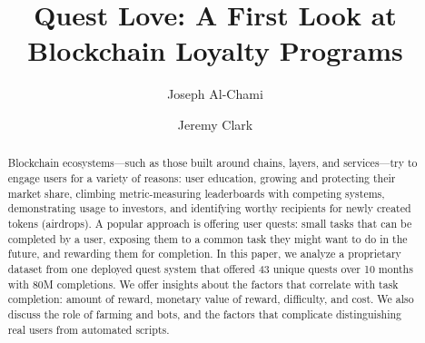 \documentclass[runningheads]{llncs}
\begin{document}
\title{Quest Love: A First Look at Blockchain Loyalty Programs}

\author{
	Joseph Al-Chami \and 
	Jeremy Clark
	}

	
	

\maketitle



\begin{abstract}

Blockchain ecosystems---such as those built around chains, layers, and services---try to engage users for a variety of reasons: user education, growing and protecting their market share, climbing metric-measuring leaderboards with competing systems, demonstrating usage to investors, and identifying worthy recipients for newly created tokens (airdrops). A popular approach is offering user quests: small tasks that can be completed by a user, exposing them to a common task they might want to do in the future, and rewarding them for completion. In this paper, we analyze a proprietary dataset from one deployed quest system that offered 43 unique quests over 10 months with 80M completions. We offer insights about the factors that correlate with task completion: amount of reward, monetary value of reward, difficulty, and cost. We also discuss the role of farming and bots, and the factors that complicate distinguishing real users from automated scripts.

\end{abstract}




\end{document}
